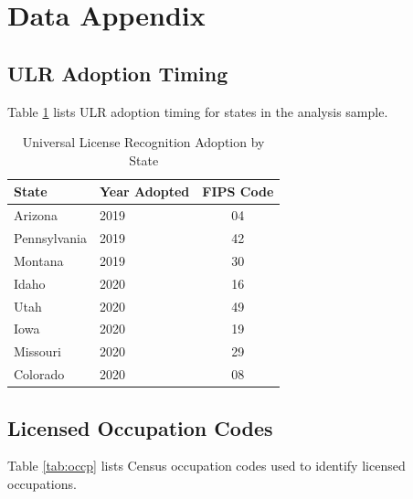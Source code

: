 \documentclass[12pt]{article}
\begin{document}
\newpage
\appendix

\section{Data Appendix}

\subsection{ULR Adoption Timing}

Table \ref{tab:adoption} lists ULR adoption timing for states in the analysis sample.

\begin{table}[H]
\centering
\caption{Universal License Recognition Adoption by State}
\begin{tabular}{llc}
\toprule
State & Year Adopted & FIPS Code \\
\midrule
Arizona & 2019 & 04 \\
Pennsylvania & 2019 & 42 \\
Montana & 2019 & 30 \\
Idaho & 2020 & 16 \\
Utah & 2020 & 49 \\
Iowa & 2020 & 19 \\
Missouri & 2020 & 29 \\
Colorado & 2020 & 08 \\
\bottomrule
\end{tabular}
\label{tab:adoption}
\end{table}

\subsection{Licensed Occupation Codes}

Table \ref{tab:occp} lists Census occupation codes used to identify licensed occupations.
\end{document}
